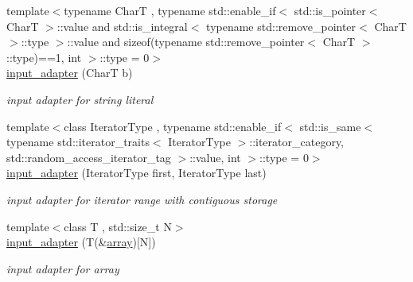 \begin{DoxyCompactItemize}
\mbox{\label{classnlohmann_1_1detail_1_1input__adapter_a86f035d9c4319360014b922b5e433ced}} 
{\footnotesize template$<$typename CharT , typename std\+::enable\+\_\+if$<$ std\+::is\+\_\+pointer$<$ Char\+T $>$\+::value and std\+::is\+\_\+integral$<$ typename std\+::remove\+\_\+pointer$<$ Char\+T $>$\+::type $>$\+::value and sizeof(typename std\+::remove\+\_\+pointer$<$ Char\+T $>$\+::type)==1, int $>$\+::type  = 0$>$ }\\\mbox{\hyperlink{classnlohmann_1_1detail_1_1input__adapter_a86f035d9c4319360014b922b5e433ced}{input\+\_\+adapter}} (CharT b)
\begin{DoxyCompactList}\small\item\em input adapter for string literal \end{DoxyCompactList}\item 
\mbox{\label{classnlohmann_1_1detail_1_1input__adapter_ad6824b0f792691f75186c527fa31a6b4}} 
{\footnotesize template$<$class Iterator\+Type , typename std\+::enable\+\_\+if$<$ std\+::is\+\_\+same$<$ typename std\+::iterator\+\_\+traits$<$ Iterator\+Type $>$\+::iterator\+\_\+category, std\+::random\+\_\+access\+\_\+iterator\+\_\+tag $>$\+::value, int $>$\+::type  = 0$>$ }\\\mbox{\hyperlink{classnlohmann_1_1detail_1_1input__adapter_ad6824b0f792691f75186c527fa31a6b4}{input\+\_\+adapter}} (Iterator\+Type first, Iterator\+Type last)
\begin{DoxyCompactList}\small\item\em input adapter for iterator range with contiguous storage \end{DoxyCompactList}\item 
\mbox{\label{classnlohmann_1_1detail_1_1input__adapter_aa2392138bf8307df1994dc7eb22d51ce}} 
{\footnotesize template$<$class T , std\+::size\+\_\+t N$>$ }\\\mbox{\hyperlink{classnlohmann_1_1detail_1_1input__adapter_aa2392138bf8307df1994dc7eb22d51ce}{input\+\_\+adapter}} (T(\&\mbox{\hyperlink{namespacenlohmann_1_1detail_a90aa5ef615aa8305e9ea20d8a947980faf1f713c9e000f5d3f280adbd124df4f5}{array}})\mbox{[}N\mbox{]})
\begin{DoxyCompactList}\small\item\em input adapter for array \end{DoxyCompactList}\item 

\end{DoxyCompactItemize}
